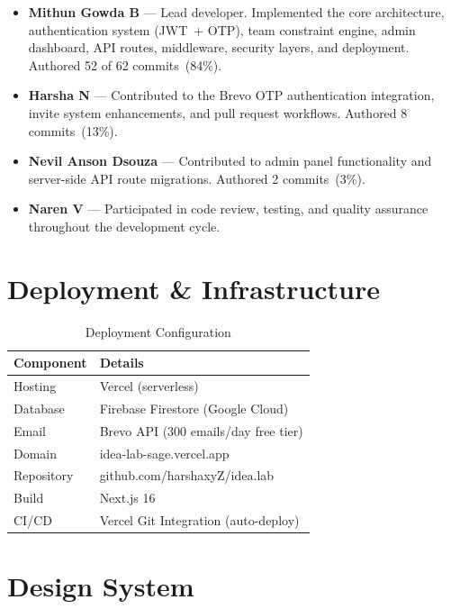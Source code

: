 \documentclass[conference]{IEEEtran}
\begin{document}
\begin{itemize}[noitemsep,topsep=3pt]
    \item \textbf{Mithun Gowda B} --- Lead developer. Implemented the core architecture, authentication system (JWT~+ OTP), team constraint engine, admin dashboard, API routes, middleware, security layers, and deployment. Authored 52 of 62 commits~(84\%).
    \item \textbf{Harsha N} --- Contributed to the Brevo OTP authentication integration, invite system enhancements, and pull request workflows. Authored 8 commits~(13\%).
    \item \textbf{Nevil Anson Dsouza} --- Contributed to admin panel functionality and server-side API route migrations. Authored 2 commits~(3\%).
    \item \textbf{Naren V} --- Participated in code review, testing, and quality assurance throughout the development cycle.
\end{itemize}

\section{Deployment \& Infrastructure}

\begin{table}[htbp]
\centering
\caption{Deployment Configuration}
\label{tab:deploy}
\footnotesize
\renewcommand{\arraystretch}{1.15}
\begin{tabular}{@{}ll@{}}
\toprule
\textbf{Component} & \textbf{Details} \\
\midrule
Hosting & Vercel (serverless) \\
Database & Firebase Firestore (Google Cloud) \\
Email & Brevo API (300 emails/day free tier) \\
Domain & idea-lab-sage.vercel.app \\
Repository & github.com/harshaxyZ/idea.lab \\
Build & Next.js 16 \\
CI/CD & Vercel Git Integration (auto-deploy) \\
\bottomrule
\end{tabular}
\end{table}

\section{Design System}
\end{document}
